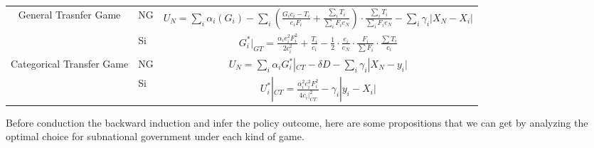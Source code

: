 \begin{itemize}
\begin{table}[htbp]
\begin{tabular}{clc}
                                                               &                                            &                                                                                                                                                                            \\
    \midrule
    \multirow{3}[4]{*}{General Trasnfer Game}                  & \multicolumn{1}{p{2.855em}}{NG}            & $U_N=\sum_i \alpha_i(G_i)-\sum_i(\frac{G_ic_i-T_i}{e_iF_i}+\frac{\sum_iT_i}{\sum_iF_ie_N})\cdot \frac{\sum_iT_i}{\sum_iF_ie_N}-\sum_i \gamma_i|X_N-X_i| $                  \\
    \cmidrule{2-3}                                             & \multicolumn{1}{l}{\multirow{2}[2]{*}{Si}} & \multirow{2}[2]{*}{$G_i^*|_{GT}=\frac{\alpha_i e_i^2F_i^2}{2c_i^2}+\frac{T_i}{c_i}-\frac{1}{2}\cdot \frac{e_i}{e_N}\cdot \frac{F_i}{\sum F_i} \cdot \frac{\sum T_i}{c_i}$} \\
                                                               &                                            &                                                                                                                                                                            \\
    \midrule
    \multirow{3}[4]{*}{Categorical Transfer Game}              & \multicolumn{1}{p{2.855em}}{NG}            & $U_N=\sum_i \alpha_iG_i^*|_{CT}-\delta D-\sum_i \gamma_i |X_N-y_i|  $                                                                                                      \\
    \cmidrule{2-3}                                             & \multicolumn{1}{l}{\multirow{2}[2]{*}{Si}} & \multirow{2}[2]{*}{ $U_i^*|_{CT}=\frac{\alpha_i^2 e_i^2 F_i^2}{4c_i|_{CT}^2}-\gamma_i|y_i-X_i|$}                                                                           \\
                                                               &                                            &                                                                                                                                                                            \\
    \bottomrule
  \end{tabular}%
  \label{utilitytable}%
\end{table}%

Before conduction the backward induction and infer the policy outcome, here are some propositions that we can get by analyzing the optimal choice for subnational government under each kind of game.


\end{itemize}
